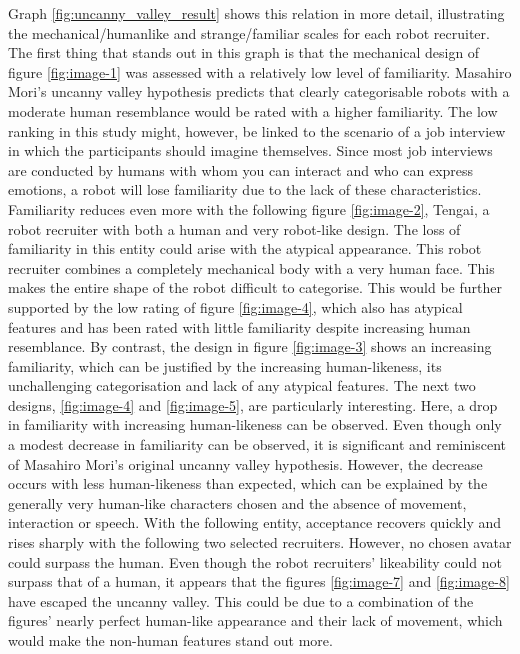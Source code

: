 Graph \ref{fig:uncanny_valley_result} shows this relation in more detail, illustrating the mechanical/humanlike and strange/familiar scales for each robot recruiter. The first thing that stands out in this graph is that the mechanical design of figure \ref{fig:image-1} was assessed with a relatively low level of familiarity. Masahiro Mori's uncanny valley hypothesis predicts that clearly categorisable robots with a moderate human resemblance would be rated with a higher familiarity. The low ranking in this study might, however, be linked to the scenario of a job interview in which the participants should imagine themselves. Since most job interviews are conducted by humans with whom you can interact and who can express emotions, a robot will lose familiarity due to the lack of these characteristics. Familiarity reduces even more with the following figure \ref{fig:image-2}, Tengai, a robot recruiter with both a human and very robot-like design. The loss of familiarity in this entity could arise with the atypical appearance. This robot recruiter combines a completely mechanical body with a very human face. This makes the entire shape of the robot difficult to categorise. This would be further supported by the low rating of figure \ref{fig:image-4}, which also has atypical features and has been rated with little familiarity despite increasing human resemblance. By contrast, the design in figure \ref{fig:image-3}  shows an increasing familiarity, which can be justified by the increasing human-likeness, its unchallenging categorisation and lack of any atypical features. The next two designs, \ref{fig:image-4} and \ref{fig:image-5}, are particularly interesting. Here, a drop in familiarity with increasing human-likeness can be observed. Even though only a modest decrease in familiarity can be observed, it is significant and reminiscent of Masahiro Mori's original uncanny valley hypothesis. However, the decrease occurs with less human-likeness than expected, which can be explained by the generally very human-like characters chosen and the absence of movement, interaction or speech. With the following entity, acceptance recovers quickly and rises sharply with the following two selected recruiters. However, no chosen avatar could surpass the human. Even though the robot recruiters' likeability could not surpass that of a human, it appears that the figures \ref{fig:image-7} and \ref{fig:image-8} have escaped the uncanny valley. This could be due to a combination of the figures' nearly perfect human-like appearance and their lack of movement, which would make the non-human features stand out more.\\
